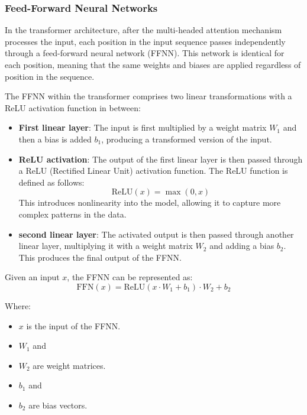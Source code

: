 \subsubsection{Feed-Forward Neural Networks}

In the transformer architecture, after the multi-headed attention mechanism processes the input, each position in the input sequence passes independently through a feed-forward neural network (FFNN). This network is identical for each position, meaning that the same weights and biases are applied regardless of position in the sequence.

The FFNN within the transformer comprises two linear transformations with a ReLU activation function in between:

\begin{itemize}
    \item \textbf{First linear layer}: The input is first multiplied by a weight matrix \( W_1 \) and then a bias is added \( b_1 \), producing a transformed version of the input.
    \item \textbf{ReLU activation}: The output of the first linear layer is then passed through a ReLU (Rectified Linear Unit) activation function. The ReLU function is defined as follows:
    \begin{equation}
        \text{ReLU}(x) = \max(0, x)
    \end{equation}
    This introduces nonlinearity into the model, allowing it to capture more complex patterns in the data.
    \item \textbf{second linear layer}: The activated output is then passed through another linear layer, multiplying it with a weight matrix \( W_2 \) and adding a bias \( b_2 \). This produces the final output of the FFNN.
\end{itemize}

Given an input \( x \), the FFNN can be represented as:
\begin{equation}
    \text{FFN}(x) = \text{ReLU}(x \cdot W_1 + b_1) \cdot W_2 + b_2
\end{equation}

Where:
\begin{itemize}
    \item \( x \) is the input of the FFNN.
    \item \( W_1 \) and \item \( W_2 \) are weight matrices.
    \item \( b_1 \) and \item \( b_2 \) are bias vectors.
\end{itemize}

